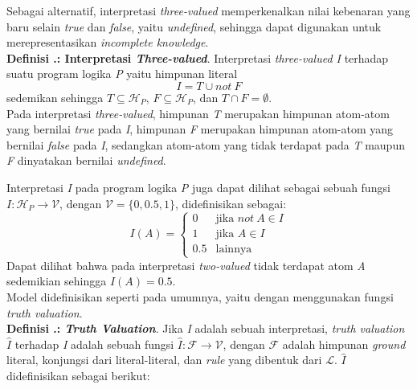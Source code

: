 Sebagai alternatif, interpretasi \textit{three-valued} memperkenalkan nilai kebenaran yang baru selain \textit{true} dan \textit{false}, yaitu \textit{undefined}, sehingga dapat digunakan untuk merepresentasikan \textit{incomplete knowledge}.
\\

\noindent \textbf{Definisi \thebabDuaNum.\thedefBabDua: Interpretasi \textit{Three-valued}}. Interpretasi \textit{three-valued I} terhadap suatu program logika \textit{P} yaitu himpunan literal
\begin{displaymath}
I = T \cup not \ F
\end{displaymath}
sedemikan sehingga $T \subseteq \mathcal{H}_P$, $F \subseteq \mathcal{H}_P$, dan $T \cap F = \emptyset$.
\\

\noindent Pada interpretasi \textit{three-valued}, himpunan \textit{T} merupakan himpunan atom-atom yang bernilai \textit{true} pada \textit{I}, himpunan \textit{F} merupakan himpunan atom-atom yang bernilai \textit{false} pada \textit{I}, sedangkan atom-atom yang tidak terdapat pada \textit{T} maupun \textit{F} dinyatakan bernilai \textit{undefined}.

Interpretasi \textit{I} pada program logika \textit{P} juga dapat dilihat sebagai sebuah fungsi $I : \mathcal{H}_P \rightarrow \mathcal{V}$, dengan $\mathcal{V} = \{0,0.5,1\}$, didefinisikan sebagai:
\begin{displaymath}
	I(A) = 
	\begin{cases}
		0 & \text{jika $not \ A \in I$} \\
		1 & \text{jika $A \in I$} \\
		0.5 & \text{lainnya}
	\end{cases}
\end{displaymath}
Dapat dilihat bahwa pada interpretasi \textit{two-valued} tidak terdapat atom \textit{A} sedemikian sehingga $I(A) = 0.5$.
\\

Model didefinisikan seperti pada umumnya, yaitu dengan menggunakan fungsi \textit{truth valuation}.
\\

\noindent \textbf{Definisi \thebabDuaNum.\thedefBabDua: \textit{Truth Valuation}}. Jika \textit{I} adalah sebuah interpretasi, \textit{truth valuation} $\hat{I}$ terhadap \textit{I} adalah sebuah fungsi $\hat{I} : \mathcal{F} \rightarrow \mathcal{V}$, dengan $\mathcal{F}$ adalah himpunan \textit{ground} literal, konjungsi dari literal-literal, dan \textit{rule} yang dibentuk dari $\mathcal{L}$. $\hat{I}$ didefinisikan sebagai berikut:

